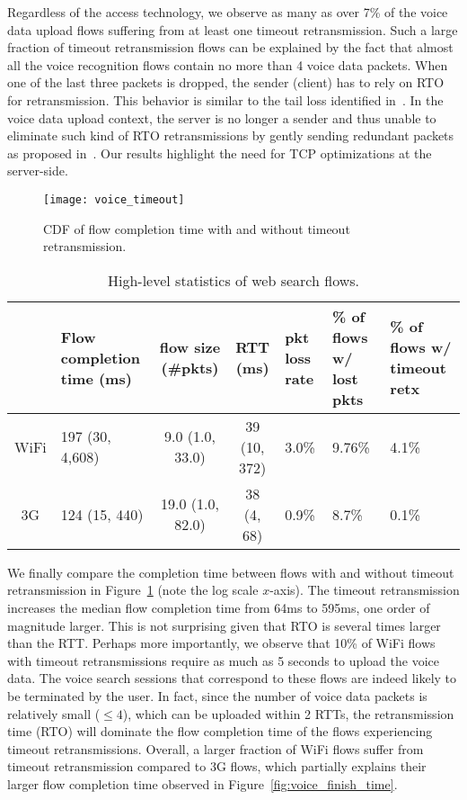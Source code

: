 Regardless of the access technology, we observe as many as over 7\% of the voice data upload flows suffering from at least one timeout retransmission. Such a large fraction of timeout retransmission flows can be explained by the fact that almost all the voice recognition flows contain no more than 4 voice data packets. When one of the last three packets is dropped, the sender (\ie client) has to rely on RTO for retransmission. This behavior is similar to the tail loss identified in~\cite{flach2013reducing}. In the voice data upload context, the server is no longer a sender and thus unable to eliminate such kind of RTO retransmissions by gently sending redundant packets as proposed in~\cite{flach2013reducing}. Our results highlight the need for TCP optimizations at the server-side. 

\begin{figure}[th]
\centering
	\texttt{[image: voice\_timeout]}
\caption{CDF of flow completion time with and without timeout retransmission.}
\label{fig:voice_rto}
\end{figure}

\begin{table*}[t]
\caption{High-level statistics of web search flows.}
\label{tab:web_stats}
\centering
\renewcommand{\arraystretch}{1.0}
\begin{tabular}{c|C{2.6cm}|c|c|C{1.2cm}|C{1.85cm}|C{2.1cm}}
	\hline
	& {Flow completion time (ms)} & {flow size (\#pkts)} & {RTT (ms)} & pkt loss rate & \% of flows w/ lost pkts & \% of flows w/ timeout retx \\
	\hline
	WiFi & 197 (30, 4,608) & 9.0 (1.0, 33.0) & 39 (10, 372) & 3.0\% & 9.76\% & 4.1\% \\
	\hline
	3G & 124 (15, 440) & 19.0 (1.0, 82.0) & 38 (4, 68) & 0.9\% & 8.7\% & 0.1\% \\
	\hline
\end{tabular}
\end{table*}

We finally compare the completion time between flows with and without timeout retransmission in Figure~\ref{fig:voice_rto} (note the log scale $x$-axis). The timeout retransmission increases the median flow completion time from 64ms to 595ms, \ie one order of magnitude larger. This is not surprising given that RTO is several times larger than the RTT. Perhaps more importantly, we observe that 10\% of WiFi flows with timeout retransmissions require as much as 5 seconds to upload the voice data. The voice search sessions that correspond to these flows are indeed likely to be terminated by the user. In fact, since the number of voice data packets is relatively small ($\le 4$), which can be uploaded within 2 RTTs, the retransmission time (\ie RTO) will dominate the flow completion time of the flows experiencing timeout retransmissions.  Overall, a larger fraction of WiFi flows suffer from timeout retransmission compared to 3G flows, which partially explains their larger flow completion time observed in Figure~\ref{fig:voice_finish_time}.

